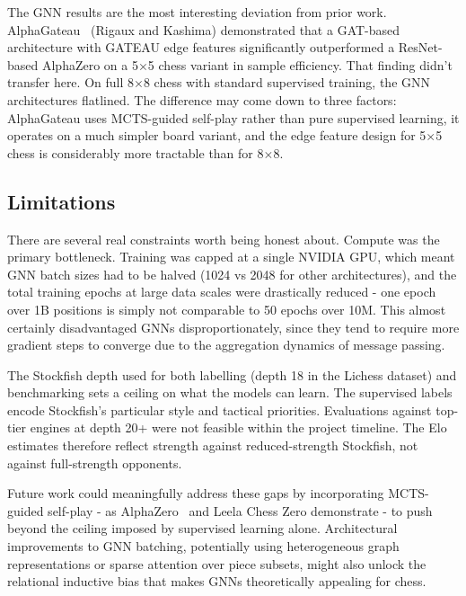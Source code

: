 The GNN results are the most interesting deviation from prior work. AlphaGateau~\cite{gnn_chess} (Rigaux and Kashima) demonstrated that a GAT-based architecture with GATEAU edge features significantly outperformed a ResNet-based AlphaZero on a 5$\times$5 chess variant in sample efficiency. That finding didn't transfer here. On full 8$\times$8 chess with standard supervised training, the GNN architectures flatlined. The difference may come down to three factors: AlphaGateau uses MCTS-guided self-play rather than pure supervised learning, it operates on a much simpler board variant, and the edge feature design for 5$\times$5 chess is considerably more tractable than for 8$\times$8.

\subsection{Limitations}

There are several real constraints worth being honest about. Compute was the primary bottleneck. Training was capped at a single NVIDIA GPU, which meant GNN batch sizes had to be halved (1024 vs 2048 for other architectures), and the total training epochs at large data scales were drastically reduced - one epoch over 1B positions is simply not comparable to 50 epochs over 10M. This almost certainly disadvantaged GNNs disproportionately, since they tend to require more gradient steps to converge due to the aggregation dynamics of message passing.

The Stockfish depth used for both labelling (depth 18 in the Lichess dataset) and benchmarking sets a ceiling on what the models can learn. The supervised labels encode Stockfish's particular style and tactical priorities. Evaluations against top-tier engines at depth 20+ were not feasible within the project timeline. The Elo estimates therefore reflect strength against reduced-strength Stockfish, not against full-strength opponents.

Future work could meaningfully address these gaps by incorporating MCTS-guided self-play - as AlphaZero~\cite{alphago_paper} and Leela Chess Zero demonstrate - to push beyond the ceiling imposed by supervised learning alone. Architectural improvements to GNN batching, potentially using heterogeneous graph representations or sparse attention over piece subsets, might also unlock the relational inductive bias that makes GNNs theoretically appealing for chess.
